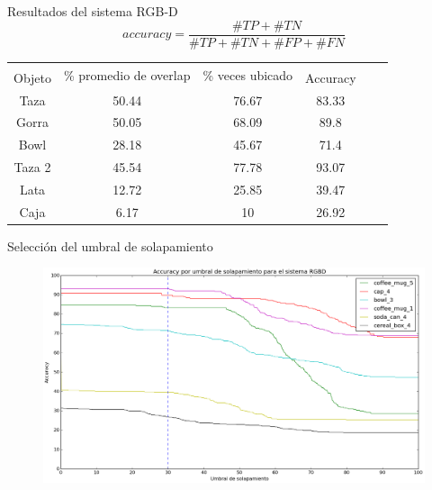 \documentclass[]{beamer}
\begin{document}
\begin{frame}[t]{Resultados del sistema RGB-D}
    \small
    $$
    accuracy = \frac{\#TP + \#TN}{\#TP + \#TN + \#FP + \#FN}
    $$
    \normalsize
    \begin{table}[h]
    	\centering
        \begin{tabular}{|c|c|c|c|c|c|}
        \hline
        & \multirow{2}{2.4cm}{\% promedio de overlap} & \multirow{2}{2cm}{\% veces ubicado} &\\
    	Objeto & & & Accuracy\\
    	\hline
        Taza    & 50.44      & 76.67     & 83.33 \\
        \hline
        Gorra   & 50.05      & 68.09     & 89.8 \\
        \hline
        Bowl    & 28.18      & 45.67     & 71.4 \\
        \hline
        Taza 2  & 45.54      & 77.78     & 93.07 \\
        \hline
        Lata    & 12.72      & 25.85     & 39.47 \\
        \hline
        Caja    &  6.17      &    10     & 26.92 \\
        \hline
        \end{tabular}
    \end{table}
\end{frame}


\begin{frame}[t]{Selección del umbral de solapamiento}
    \begin{figure}
        \centering
        \includegraphics[scale=0.22]{img/accuracy_sistemaRGBD.png}
    \end{figure}
\end{frame}
\end{document}
